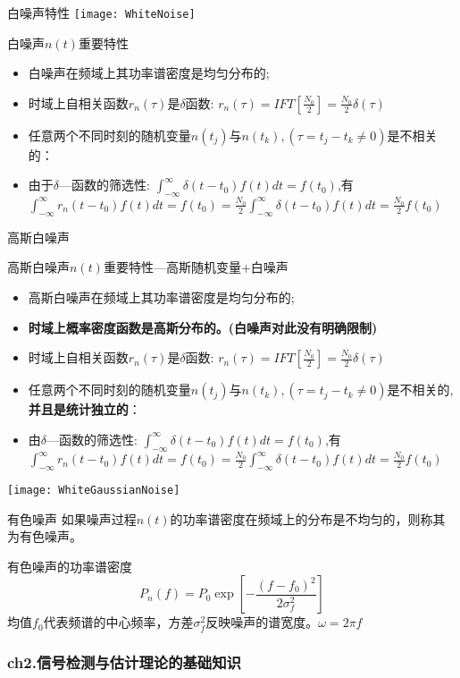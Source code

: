 \begin{frame}{白噪声特性}
\texttt{[image: WhiteNoise]}
\begin{block}{白噪声$n(t)$重要特性}
	\begin{itemize}
		\item 白噪声在频域上其功率谱密度是均匀分布的;
		\item 时域上自相关函数$r_n(\tau)$是$\delta$函数: $r_n(\tau)=IFT[\frac{N_0}{2}]=\frac{N_0}{2}\delta(\tau)$
		\item 任意两个不同时刻的随机变量$n(t_j)$与$n(t_k),(\tau=t_j-t_k\ne 0)$是不相关的：\\
		\item 由于$\delta$---函数的筛选性: $\int_{-\infty}^{\infty}\delta(t-t_0)f(t)dt=f(t_0)$,有\\
		$\int_{-\infty}^{\infty}r_n(t-t_0)f(t)dt=f(t_0)=\frac{N_0}{2}\int_{-\infty}^{\infty}\delta(t-t_0)f(t)dt=\frac{N_0}{2}f(t_0)$
	\end{itemize}	
\end{block}
\end{frame}

\begin{frame}{高斯白噪声}
\begin{block}{高斯白噪声$n(t)$重要特性---高斯随机变量+白噪声}
	\begin{itemize}
		\item 高斯白噪声在频域上其功率谱密度是均匀分布的;
		\item \textbf{时域上概率密度函数是高斯分布的。(白噪声对此没有明确限制)}
		\item 时域上自相关函数$r_n(\tau)$是$\delta$函数: $r_n(\tau)=IFT[\frac{N_0}{2}]=\frac{N_0}{2}\delta(\tau)$
		\item 任意两个不同时刻的随机变量$n(t_j)$与$n(t_k),(\tau=t_j-t_k\ne 0)$是不相关的,\textbf{并且是统计独立的}：\\
		\item 由$\delta$---函数的筛选性: $\int_{-\infty}^{\infty}\delta(t-t_0)f(t)dt=f(t_0)$,有\\
		$\int_{-\infty}^{\infty}r_n(t-t_0)f(t)dt=f(t_0)=\frac{N_0}{2}\int_{-\infty}^{\infty}\delta(t-t_0)f(t)dt=\frac{N_0}{2}f(t_0)$
	\end{itemize}	
\end{block}
\texttt{[image: WhiteGaussianNoise]}
\end{frame}

\begin{frame}{有色噪声}
如果噪声过程$n(t)$的功率谱密度在频域上的分布是不均匀的，则称其为有色噪声。
\begin{block}{有色噪声的功率谱密度}
	\[P_n(f) =P_0\exp\left[-\frac{(f-f_0)^2}{2\sigma_f^2}\right]\]
	均值$f_0$代表频谱的中心频率，方差$\sigma_f^2$反映噪声的谱宽度。$\omega=2\pi f$
\end{block}
\end{frame}

\begin{frame}[shrink]
\frametitle{ch2.信号检测与估计理论的基础知识}
\tableofcontents[hideallsubsections]
\end{frame}


